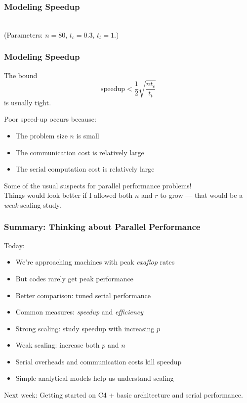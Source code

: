 \documentclass{beamer}
\begin{document}
\begin{frame}
\frametitle{Modeling Speedup}

\begin{center}
   \\[1cm]
(Parameters: $n = 80$, $t_c = 0.3$, $t_t = 1$.)
\end{center}
\end{frame}


\begin{frame}
\frametitle{Modeling Speedup}

The bound
\[
  \mathrm{speedup} < 
  \frac{1}{2} \sqrt{\frac{n t_c}{t_t}} 
\]
is usually tight.
\vspace{5mm}

Poor speed-up occurs because:
\begin{itemize}
\item The problem size $n$ is small
\item The communication cost is relatively large
\item The serial computation cost is relatively large
\end{itemize}
Some of the usual suspects for parallel performance problems! \\[5mm]
Things would look better if I allowed both $n$ and $r$ to grow ---
that would be a {\em weak} scaling study.

\end{frame}

\begin{frame}
  \frametitle{Summary: Thinking about Parallel Performance}

  Today:
  \begin{itemize}
  \item We're approaching machines with peak {\em exaflop} rates
  \item But codes rarely get peak performance
  \item Better comparison: tuned serial performance
  \item Common measures: {\em speedup} and {\em efficiency}
  \item Strong scaling: study speedup with increasing $p$
  \item Weak scaling: increase both $p$ and $n$
  \item Serial overheads and communication costs kill speedup
  \item Simple analytical models help us understand scaling
  \end{itemize}

  \vspace{5mm}
  Next week: Getting started on C4 + basic architecture and serial performance.
\end{frame}
\end{document}
